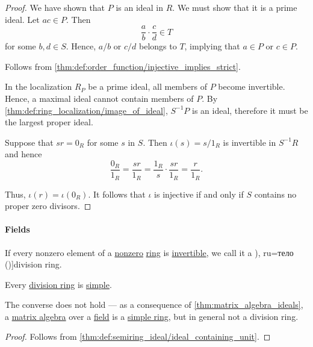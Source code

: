\begin{proof}
  We have shown that \( P \) is an ideal in \( R \). We must show that it is a prime ideal. Let \( ac \in P \). Then
  \begin{equation*}
    \frac a b \cdot \frac c d \in T
  \end{equation*}
  for some \( b, d \in S \). Hence, \( a / b \) or \( c / d \) belongs to \( T \), implying that \( a \in P \) or \( c \in P \).

   Follows from \cref{thm:def:order_function/injective_implies_strict}.

   In the localization \( R_P \) be a prime ideal, all members of \( P \) become invertible. Hence, a maximal ideal cannot contain members of \( P \). By \cref{thm:def:ring_localization/image_of_ideal}, \( S^{-1} P \) is an ideal, therefore it must be the largest proper ideal.

   Suppose that \( sr = 0_R \) for some \( s \) in \( S \). Then \( \iota(s) = s / 1_R \) is invertible in \( S^{-1} R \) and hence
  \begin{equation*}
    \frac {0_R} {1_R}
    =
    \frac {sr} {1_R}
    =
    \frac {1_R} s \cdot \frac {sr} {1_R}
    =
    \frac r {1_R}.
  \end{equation*}

  Thus, \( \iota(r) = \iota(0_R) \). It follows that \( \iota \) is injective if and only if \( S \) contains no proper zero divisors.
\end{proof}

\paragraph{Fields}

\begin{definition}\label{def:division_ring}
  If every nonzero element of a \hyperref[def:ring/trivial]{nonzero} \hyperref[def:ring]{ring} is \hyperref[def:semiring_divisibility/invertible]{invertible}, we call it a \term[bg=тяло (\cite[394]{Обрешков1962ВисшаАлгебра}), ru=тело (\cite[def. XI.6.6]{Винберг2014КурсАлгебры})]{division ring}.
\end{definition}

\begin{proposition}\label{thm:division_ring_is_simple}
  Every \hyperref[def:division_ring]{division ring} is \hyperref[def:ring/simple]{simple}.
\end{proposition}
\begin{comments}
  \item The converse does not hold --- as a consequence of \cref{thm:matrix_algebra_ideals}, a \hyperref[thm:matrix_algebra]{matrix algebra} over a \hyperref[def:field]{field} is a \hyperref[def:ring/simple]{simple ring}, but in general not a division ring.
\end{comments}
\begin{proof}
  Follows from \cref{thm:def:semiring_ideal/ideal_containing_unit}.
\end{proof}

